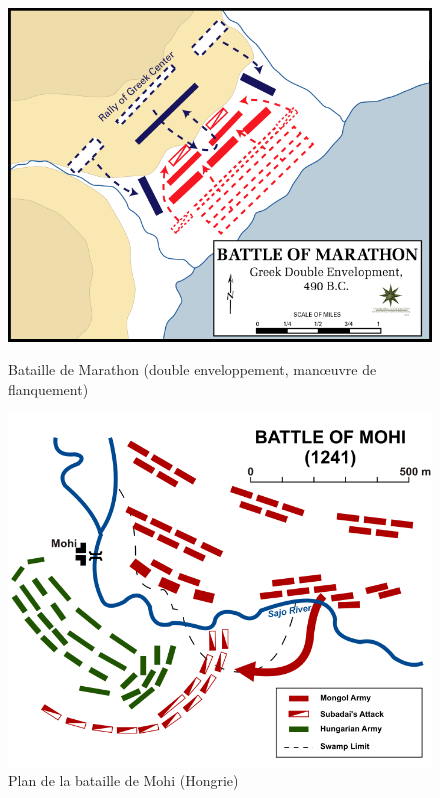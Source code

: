 \documentclass{article}
\begin{document}
\begin{center}
\begin{figure}[H]
\hfill
\begin{minipage}[H]{0.5\linewidth}
	\centering
	\includegraphics[width=\linewidth]{../ressources/Battle_of_Marathon}
	\caption{Bataille de Marathon (double enveloppement, manœuvre de flanquement) \cite{flanking_maneuver}}
\end{minipage}
\hfill
\begin{minipage}[H]{0.45\linewidth}
	\centering
	\includegraphics[width=\linewidth]{../ressources/Battle_of_Mohi}
	\caption{Plan de la bataille de Mohi (Hongrie) \cite{mohi_battle}}
\end{minipage}
\hfill
\end{figure}
\end{center}
\end{document}
